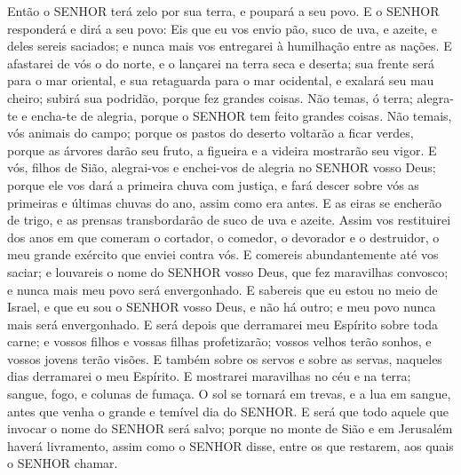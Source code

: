 {  Então o SENHOR terá zelo por sua terra, e poupará a seu povo.
  E o SENHOR responderá e dirá a seu povo: Eis que eu vos envio pão, suco de uva, e azeite, e deles sereis saciados; e nunca mais vos entregarei à humilhação entre as nações.
  E afastarei de vós o
{} do norte, e o lançarei na terra seca e deserta; sua frente será para o mar oriental, e sua retaguarda para o mar ocidental, e exalará seu mau cheiro; subirá sua podridão, porque fez grandes coisas.
  Não temas, ó terra; alegra-te e encha-te de alegria, porque o SENHOR tem feito grandes coisas.
  Não temais, vós animais do campo; porque os pastos do deserto voltarão a ficar verdes, porque as árvores darão seu fruto, a figueira e a videira mostrarão seu vigor.
  E vós, filhos de Sião, alegrai-vos e enchei-vos de alegria no SENHOR vosso Deus; porque ele vos dará a primeira chuva com justiça, e fará descer sobre vós as primeiras e últimas chuvas do ano, assim como era antes.
  E as eiras se encherão de trigo, e as prensas transbordarão de suco de uva e azeite.
  Assim vos restituirei dos anos em que comeram o cortador, o comedor, o devorador e o destruidor, o meu grande exército que enviei contra vós.
  E comereis abundantemente até vos saciar; e louvareis o nome do SENHOR vosso Deus, que fez maravilhas convosco; e nunca mais meu povo será envergonhado.
  E sabereis que eu estou no meio de Israel, e que eu sou o SENHOR vosso Deus, e não há outro; e meu povo nunca mais será envergonhado.
  E será depois que derramarei meu Espírito sobre toda carne;
 e vossos filhos e vossas filhas profetizarão; vossos velhos terão sonhos, e vossos jovens terão visões.
  E também sobre os servos e sobre as servas, naqueles dias derramarei o meu Espírito.
  E mostrarei maravilhas no céu e na terra; sangue, fogo, e colunas de fumaça.
  O sol se tornará em trevas, e a lua em sangue, antes que venha o grande e temível dia do SENHOR.
  E será que todo aquele que invocar o nome do SENHOR será salvo; porque no monte de Sião e em Jerusalém haverá livramento, assim como o SENHOR disse, entre os que restarem, aos quais o SENHOR chamar.
\par }

